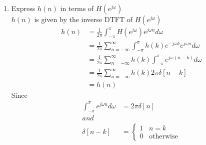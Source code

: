 \documentclass[journal,12pt,twocolumn]{IEEEtran}
\renewcommand\thesection{\arabic{section}}
\begin{document}
\begin{enumerate}[label=\thesection.\arabic*
,ref=\thesection.\theenumi]
\begin{align}
	H\brak{e^{\j \omega}} &= \frac{1 + e^{-2\j\omega}}{1 + \frac12 e^{-\j\omega}} \\
	\implies \abs{H\brak{e^{\j \omega}}} &= \frac{\abs{1 + \cos2\omega - \j\sin2\omega}}{\abs{1 + \frac12 \cos\omega - \frac12 \sin\omega}} \\
	&= \sqrt{\frac{(1 + \cos2\omega)^2 + (\sin2\omega)^2}{(1 + \frac12 \cos\omega)^2 + (\frac12 \sin\omega)^2}} \\
	&= \sqrt{\frac{2 + 2\cos2\omega}{\frac54 + \cos\omega}} \\
	&= \sqrt{\frac{2(2\cos^2\omega)4}{5 + 4\cos\omega} } \\
	&= \frac{4\abs{\cos\omega}}{\sqrt{5 + 4\cos\omega}}
\end{align}

period of $\abs{cos \omega}$ is $\pi$ and period of $\sqrt{5 + 4\cos \omega}$ is $2\pi$.\\
Now period of $\abs{H\brak{e^{\j \omega}}}$ is $\frac{LCM(\pi,2\pi)}{HCF(\pi,2\pi)}$ = $\frac{2\pi}{1}$ = $2\pi$\\

\item Express $h(n)$ in terms of $H(e^{j\omega})$\\
\solution $h(n)$ is given by the inverse DTFT of $H(e^{j\omega})$
\begin{align}
	h(n) &= \frac{1}{2\pi}\int_{-\pi}^\pi H(e^{j\omega})e^{j\omega n}d\omega\\
	&=\frac{1}{2\pi}\sum_{n=-\infty}^\infty\int_{-\pi}^\pi h(k)e^{-j\omega k} e^{j\omega n} d\omega \\
	&=\frac{1}{2\pi}\sum_{n=-\infty}^\infty h(k)\int_{-\pi}^{\pi}e^{j\omega(n-k)}d\omega \\
	&= \frac{1}{2\pi}\sum_{n=-\infty}^\infty h(k) 2\pi \delta[n-k]\\
	&=h(n)
\end{align}
Since 
\begin{align}
	\int_{-\pi}^{\pi}e^{j\omega n}d\omega &=2\pi \delta[n]\\
	and \\
	\delta[n-k]&=
	\begin{cases}
		1 & n =k
		\\
		0 & \text{otherwise}
	\end{cases}
\end{align}



\end{enumerate}
\end{document}
